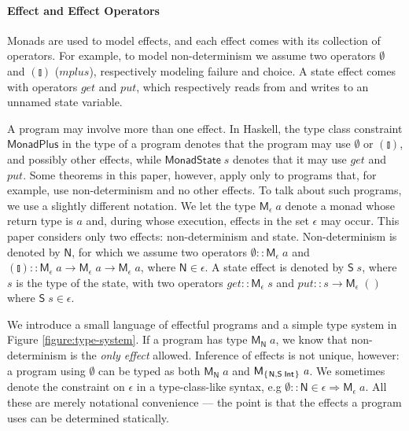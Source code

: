 \documentclass{llncs}
\newcommand{\Conid}[1]{\mathit{#1}}
\newcommand{\Varid}[1]{\mathit{#1}}
\let\Varid\mathit
\let\Conid\mathsf
\begin{document}
\paragraph{Effect and Effect Operators}
Monads are used to model effects, and each effect comes with its collection of operators. For example, to model non-determinism we assume two operators \ensuremath{\emptyset} and \ensuremath{(\talloblong)} ($\Varid{mplus}$), respectively modeling failure and choice. A state effect comes with operators \ensuremath{\Varid{get}} and \ensuremath{\Varid{put}}, which respectively reads from and writes to an unnamed state variable.

A program may involve more than one effect.
In Haskell, the type class constraint \ensuremath{\Conid{MonadPlus}} in the type of a program denotes that the program may use \ensuremath{\emptyset} or \ensuremath{(\talloblong)}, and possibly other effects, while \ensuremath{\Conid{MonadState}\;\Varid{s}} denotes that it may use \ensuremath{\Varid{get}} and \ensuremath{\Varid{put}}.
Some theorems in this paper, however, apply only to programs that, for example, use non-determinism and no other effects.
To talk about such programs, we use a slightly different notation.
We let the type \ensuremath{\Conid{M}_{\epsilon}\;\Varid{a}} denote a monad whose return type is \ensuremath{\Varid{a}} and, during whose execution, effects in the set \ensuremath{\epsilon} may occur.
This paper considers only two effects: non-determinism and state.
Non-determinism is denoted by \ensuremath{\Conid{N}}, for which we assume two operators \ensuremath{\emptyset\mathbin{::}\Conid{M}_{\epsilon}\;\Varid{a}} and \ensuremath{(\talloblong)\mathbin{::}\Conid{M}_{\epsilon}\;\Varid{a}\to \Conid{M}_{\epsilon}\;\Varid{a}\to \Conid{M}_{\epsilon}\;\Varid{a}}, where \ensuremath{\Conid{N}\in\epsilon}.
A state effect is denoted by \ensuremath{\Conid{S}\;\Varid{s}}, where \ensuremath{\Varid{s}} is the type of the state, with two operators \ensuremath{\Varid{get}\mathbin{::}\Conid{M}_{\epsilon}\;\Varid{s}} and \ensuremath{\Varid{put}\mathbin{::}\Varid{s}\to \Conid{M}_{\epsilon}\;()} where \ensuremath{\Conid{S}\;\Varid{s}\in\epsilon}.

We introduce a small language of effectful programs and a simple type system in Figure \ref{figure:type-system}.
If a program has type \ensuremath{\Conid{M}_{\Conid{N}}\;\Varid{a}}, we know that non-determinism is the {\em only effect} allowed.
Inference of effects is not unique, however: a program using \ensuremath{\emptyset} can be typed as both \ensuremath{\Conid{M}_{\Conid{N}}\;\Varid{a}} and \ensuremath{\Conid{M}_{\{\mskip1.5mu \Conid{N},\Conid{S}\;\Conid{Int}\mskip1.5mu\}}\;\Varid{a}}.
We sometimes denote the constraint on \ensuremath{\epsilon} in a type-class-like syntax, e.g \ensuremath{\emptyset\mathbin{::}\Conid{N}\in\epsilon\Rightarrow \Conid{M}_{\epsilon}\;\Varid{a}}.
All these are merely notational convenience --- the point is that the effects a program uses can be determined statically.
\end{document}
